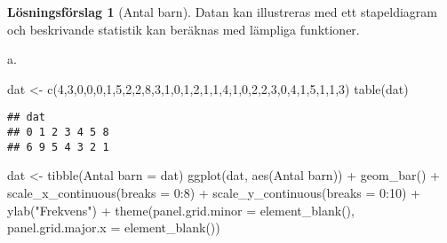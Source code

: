 \documentclass[
]{book}
\newenvironment{Shaded}{\begin{snugshade}}{\end{snugshade}}
\newcommand{\AttributeTok}[1]{\textcolor[rgb]{0.77,0.63,0.00}{#1}}
\newcommand{\DecValTok}[1]{\textcolor[rgb]{0.00,0.00,0.81}{#1}}
\newcommand{\FunctionTok}[1]{\textcolor[rgb]{0.00,0.00,0.00}{#1}}
\newcommand{\NormalTok}[1]{#1}
\newcommand{\OtherTok}[1]{\textcolor[rgb]{0.56,0.35,0.01}{#1}}
\newcommand{\SpecialCharTok}[1]{\textcolor[rgb]{0.00,0.00,0.00}{#1}}
\newcommand{\StringTok}[1]{\textcolor[rgb]{0.31,0.60,0.02}{#1}}
\theoremstyle{definition}
\theoremstyle{definition}
\theoremstyle{definition}
\theoremstyle{definition}
\newtheorem{hypothesis}{Lösningsförslag}[chapter]
\theoremstyle{remark}
\begin{document}
\begin{hypothesis}[Antal barn]
Datan kan illustreras med ett stapeldiagram och beskrivande statistik kan beräknas med lämpliga funktioner.

a.

\begin{Shaded}
\begin{Highlighting}[]
\NormalTok{dat }\OtherTok{\textless{}{-}} \FunctionTok{c}\NormalTok{(}\DecValTok{4}\NormalTok{,}\DecValTok{3}\NormalTok{,}\DecValTok{0}\NormalTok{,}\DecValTok{0}\NormalTok{,}\DecValTok{0}\NormalTok{,}\DecValTok{1}\NormalTok{,}\DecValTok{5}\NormalTok{,}\DecValTok{2}\NormalTok{,}\DecValTok{2}\NormalTok{,}\DecValTok{8}\NormalTok{,}\DecValTok{3}\NormalTok{,}\DecValTok{1}\NormalTok{,}\DecValTok{0}\NormalTok{,}\DecValTok{1}\NormalTok{,}\DecValTok{2}\NormalTok{,}\DecValTok{1}\NormalTok{,}\DecValTok{1}\NormalTok{,}\DecValTok{4}\NormalTok{,}\DecValTok{1}\NormalTok{,}\DecValTok{0}\NormalTok{,}\DecValTok{2}\NormalTok{,}\DecValTok{2}\NormalTok{,}\DecValTok{3}\NormalTok{,}\DecValTok{0}\NormalTok{,}\DecValTok{4}\NormalTok{,}\DecValTok{1}\NormalTok{,}\DecValTok{5}\NormalTok{,}\DecValTok{1}\NormalTok{,}\DecValTok{1}\NormalTok{,}\DecValTok{3}\NormalTok{)}
\FunctionTok{table}\NormalTok{(dat)}
\end{Highlighting}
\end{Shaded}

\begin{verbatim}
## dat
## 0 1 2 3 4 5 8 
## 6 9 5 4 3 2 1
\end{verbatim}

\begin{Shaded}
\begin{Highlighting}[]
\NormalTok{dat }\OtherTok{\textless{}{-}} \FunctionTok{tibble}\NormalTok{(}\StringTok{\textasciigrave{}}\AttributeTok{Antal barn}\StringTok{\textasciigrave{}} \OtherTok{=}\NormalTok{ dat)}
\FunctionTok{ggplot}\NormalTok{(dat, }\FunctionTok{aes}\NormalTok{(}\StringTok{\textasciigrave{}}\AttributeTok{Antal barn}\StringTok{\textasciigrave{}}\NormalTok{)) }\SpecialCharTok{+}
  \FunctionTok{geom\_bar}\NormalTok{() }\SpecialCharTok{+}
  \FunctionTok{scale\_x\_continuous}\NormalTok{(}\AttributeTok{breaks =} \DecValTok{0}\SpecialCharTok{:}\DecValTok{8}\NormalTok{) }\SpecialCharTok{+}
  \FunctionTok{scale\_y\_continuous}\NormalTok{(}\AttributeTok{breaks =} \DecValTok{0}\SpecialCharTok{:}\DecValTok{10}\NormalTok{) }\SpecialCharTok{+}
  \FunctionTok{ylab}\NormalTok{(}\StringTok{"Frekvens"}\NormalTok{) }\SpecialCharTok{+}
  \FunctionTok{theme}\NormalTok{(}\AttributeTok{panel.grid.minor =} \FunctionTok{element\_blank}\NormalTok{(),}
        \AttributeTok{panel.grid.major.x =} \FunctionTok{element\_blank}\NormalTok{())}
\end{Highlighting}
\end{Shaded}


\end{hypothesis}
\end{document}

